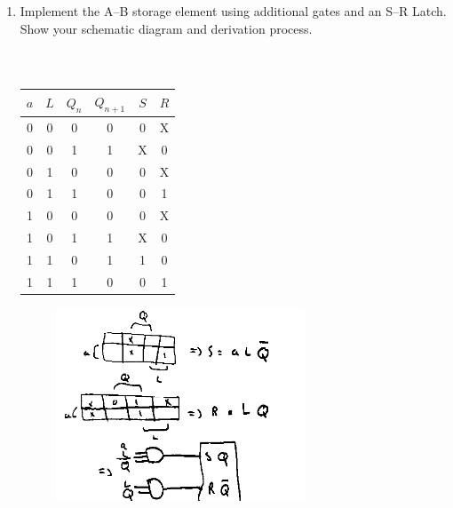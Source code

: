 \documentclass{zc-ust-hw}
\begin{document}
\begin{enumerate}
\begin{enumerate}
        \item Implement the A--B storage element using additional gates and an
          S--R Latch. Show your schematic diagram and derivation process. 

          \begin{sol} \,
            \begin{table}[H]
              \begin{center}
                \begin{tabular}{c|c|c||c|c|c}
                  \( a \) & \( L \) & \( Q_{n} \) & \( Q_{n+1} \) & \( S \) & \( R \) \\
                  \hline
                  0 & 0 & 0 & 0 & 0 & X \\
                  0 & 0 & 1 & 1 & X & 0 \\
                  0 & 1 & 0 & 0 & 0 & X \\
                  0 & 1 & 1 & 0 & 0 & 1 \\
                  1 & 0 & 0 & 0 & 0 & X \\
                  1 & 0 & 1 & 1 & X & 0 \\
                  1 & 1 & 0 & 1 & 1 & 0 \\
                  1 & 1 & 1 & 0 & 0 & 1 \\
                \end{tabular}
              \end{center}
              \caption{}
            \end{table}

            \begin{figure}[H]
              \begin{center}
                \includegraphics[width=0.70\textwidth]{figures/1702588363.png}
              \end{center}
              \caption{}
            \end{figure}
          \end{sol}
      \end{enumerate}


\end{enumerate}
\end{document}
